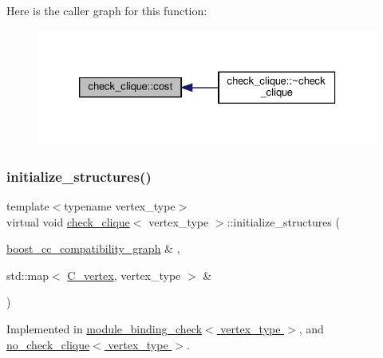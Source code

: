Here is the caller graph for this function\+:
\nopagebreak
\begin{figure}[H]
\begin{center}
\leavevmode
\includegraphics[width=326pt]{d9/d11/structcheck__clique_a81f12b024d09699d522ed560c0a96ff6_icgraph}
\end{center}
\end{figure}
\mbox{\label{structcheck__clique_a8355d3ba6eb71d487ffc36d48274db73}} 
\subsubsection{\texorpdfstring{initialize\+\_\+structures()}{initialize\_structures()}}
{\footnotesize\ttfamily template$<$typename vertex\+\_\+type$>$ \\
virtual void \hyperlink{structcheck__clique}{check\+\_\+clique}$<$ vertex\+\_\+type $>$\+::initialize\+\_\+structures (\begin{DoxyParamCaption}\item[{\hyperlink{clique__covering__graph_8hpp_af47b1c28cf9a2c360afafb8d80582ce6}{boost\+\_\+cc\+\_\+compatibility\+\_\+graph} \&}]{,  }\item[{std\+::map$<$ \hyperlink{clique__covering__graph_8hpp_a9cb45047ea8c5ed95a8cfa90494345aa}{C\+\_\+vertex}, vertex\+\_\+type $>$ \&}]{ }\end{DoxyParamCaption})\hspace{0.3cm}{\ttfamily [pure virtual]}}



Implemented in \hyperlink{structmodule__binding__check_ac6f4b1e840b4bd490be992756f3c8c0e}{module\+\_\+binding\+\_\+check$<$ vertex\+\_\+type $>$}, and \hyperlink{structno__check__clique_ada91909ec207beafc1907b4236ede31c}{no\+\_\+check\+\_\+clique$<$ vertex\+\_\+type $>$}.



